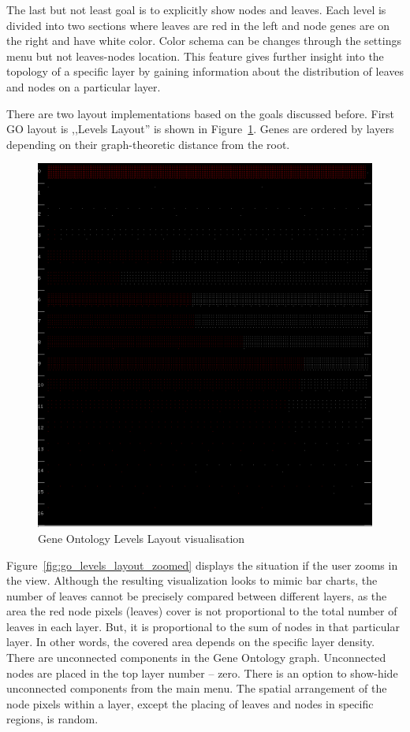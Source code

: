 The last but not least goal is to explicitly show nodes and leaves. Each level is divided into two sections where leaves are red in the left and node genes are on the right and have white color. Color schema can be changes through the settings menu but not leaves-nodes location. This feature gives further insight into the topology of a specific layer by gaining information about the distribution of leaves and nodes on a particular layer.

There are two layout implementations based on the goals discussed before. First GO layout is ,,Levels Layout'' is shown in Figure~\ref{fig:go_levels_layout}. Genes are ordered by layers depending on their graph-theoretic distance from the root.

\begin{figure}[h!]
\centering
\includegraphics[scale=0.3]{pictures/go_levels_layout.png}
\caption{Gene Ontology Levels Layout visualisation}
\label{fig:go_levels_layout}
\end{figure}

Figure~\ref{fig:go_levels_layout_zoomed} displays the situation if the user zooms in the view. Although the resulting visualization looks to mimic bar charts, the number of leaves cannot be precisely compared between different layers, as the area the red node pixels (leaves) cover is not proportional to the total number of leaves in each layer. But, it is proportional to the sum of nodes in that particular layer. In other words, the covered area depends on the specific layer density. There are unconnected components in the Gene Ontology graph. Unconnected nodes are placed in the top layer number -- zero. There is an option to show-hide unconnected components from the main menu. The spatial arrangement of the node pixels within a layer, except the placing of leaves and nodes in specific regions, is random.

